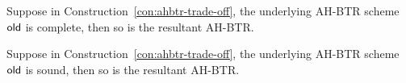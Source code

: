\begin{theorem}\label{thm:ahbtr-trade-off-completeness}
Suppose in Construction~\ref{con:ahbtr-trade-off},
the underlying AH-BTR scheme $\OLD$ is complete,
then so is the resultant AH-BTR.
\end{theorem}

\begin{theorem}\label{thm:ahbtr-trade-off-soundness}
Suppose in Construction~\ref{con:ahbtr-trade-off},
the underlying AH-BTR scheme $\OLD$ is sound,
then so is the resultant AH-BTR.
\end{theorem}
